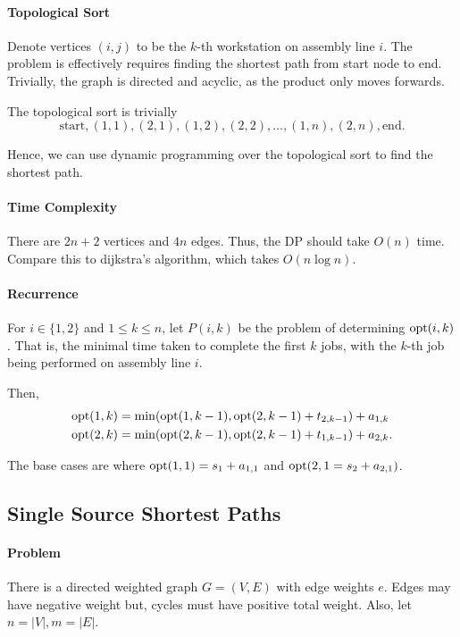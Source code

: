 \paragraph{Topological Sort}
Denote vertices \(\left( i, j \right) \) to be the \(k\)-th workstation on assembly
line  \(i\). The problem is effectively requires finding the shortest path
from start node to end.
Trivially, the graph is directed and acyclic, as the product only moves
forwards.

The topological sort is trivially \[
  \text{start}, (1, 1), (2, 1), (1, 2), (2, 2), \ldots, (1, n), (2, n), \text{end}
.\] 

Hence, we can use dynamic programming over the topological sort to
find the shortest path.

\paragraph{Time Complexity}
There are \(2n + 2\) vertices and  \(4n\) edges. Thus, the  DP should
take \(O(n)\) time. Compare this to dijkstra's algorithm, which takes
\(O(n \log n)\).

\paragraph{Recurrence}
For \(i \in \{1, 2\} \) and \(1 \leq k \leq n\), let  \(P(i, k)\)
be the problem of determining  \(\mathrm{opt}(i, k)\). That is, the minimal time taken to complete
the first  \(k\) jobs, with the  \(k\)-th job being performed on assembly line \(i\).

Then,
\begin{align*}
  \mathrm{opt}(1, k) &= \min( \mathrm{opt}(1, k - 1), \mathrm{opt}(2, k -1) + t_{2, k - 1} )  + a_{1, k} \\
  \mathrm{opt}(2, k) &= \min( \mathrm{opt}(2, k - 1), \mathrm{opt}(2, k -1) + t_{1, k - 1} )  + a_{2, k}
.\end{align*}

The base cases are where \(\mathrm{opt}(1, 1) = s_1 + a_{1, 1}\) and \(\mathrm{opt}(2, 1 = s_{2} + a_{2, 1})\).

\subsection{Single Source Shortest Paths}

\paragraph{Problem}
There is a directed weighted graph \(G = (V, E)\) with edge weights  \(e\).
Edges may have negative weight but, cycles must have positive total weight.
Also, let  \(n = |V|, m = |E|\).

